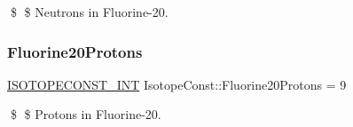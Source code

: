 \$ \$ Neutrons in Fluorine-\/20. \mbox{\label{group___isotope_const-_fluorine-_f20_ga573e954e1849eb2dbb5309ea96e79e63}} 
\subsubsection{\texorpdfstring{Fluorine20\+Protons}{Fluorine20Protons}}
{\footnotesize\ttfamily \mbox{\hyperlink{group___isotope_const-_macros_ga5f18360b3e99483a35c32d789e62621c}{I\+S\+O\+T\+O\+P\+E\+C\+O\+N\+S\+T\+\_\+\+I\+NT}} Isotope\+Const\+::\+Fluorine20\+Protons = 9}

\$ \$ Protons in Fluorine-\/20. 